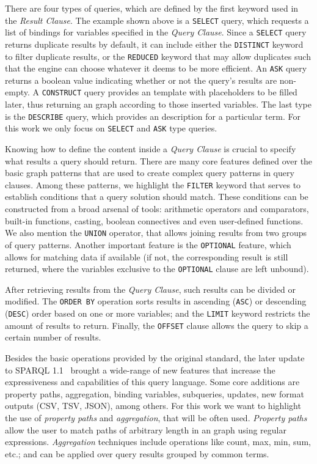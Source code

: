 There are four types of \SPARQL{} queries, which are defined by the first keyword used in the 
\textit{Result Clause}. The example shown above is a \texttt{SELECT} query, which requests a list 
of bindings for variables specified in the \textit{Query Clause}. Since a \texttt{SELECT} query 
returns duplicate results by default, it can include either the \texttt{DISTINCT} keyword to filter 
duplicate results, or the \texttt{REDUCED} keyword that may allow duplicates such that the engine 
can choose whatever it deems to be more efficient. An \texttt{ASK} query returns a boolean value 
indicating whether or not the query’s results are non-empty. A \texttt{CONSTRUCT} query provides 
an \RDF{} template with placeholders to be filled later, thus returning an \RDF{} graph according to 
those inserted variables. The last type is the \texttt{DESCRIBE} query, which provides an \RDF{} 
description for a particular \RDF{} term. For this work we only focus on \texttt{SELECT} and 
\texttt{ASK} type queries.

Knowing how to define the content inside a \textit{Query Clause} is crucial to specify what results 
a \SPARQL{} query should return. There are many core features defined over the basic graph patterns 
that are used to create complex query patterns in query clauses. Among these patterns, we highlight 
the \texttt{FILTER} keyword that serves to establish conditions that a query solution should match. 
These conditions can be constructed from a broad arsenal of tools: arithmetic operators and 
comparators, built-in functions, casting, boolean connectives and even user-defined functions. 
We also mention the \texttt{UNION} operator, that allows joining results from two groups of query 
patterns. Another important feature is the \texttt{OPTIONAL} feature, which allows for matching 
data if available (if not, the corresponding result is still returned, where the variables 
exclusive to the \texttt{OPTIONAL} clause are left unbound).

After retrieving results from the \textit{Query Clause}, such results can be divided or modified. 
The \texttt{ORDER BY} operation sorts results in ascending (\texttt{ASC}) or descending (\texttt{DESC}) order based 
on one or more variables; and the \texttt{LIMIT} keyword restricts the amount of results to return. 
Finally, the \texttt{OFFSET} clause allows the query to skip a certain number of results.

Besides the basic operations provided by the original \SPARQL{} standard, the later update to 
SPARQL 1.1~\cite{key:sparql11} brought a wide-range of new features that increase the expressiveness 
and capabilities of this query language. Some core additions are property paths, aggregation, 
binding variables, subqueries, updates, new format outputs (CSV, TSV, JSON), among others. 
For this work we want to highlight the use of \textit{property paths} and \textit{aggregation}, 
that will be often used. \textit{Property paths} allow the user to match paths of arbitrary 
length in an \RDF{} graph using regular expressions. \textit{Aggregation} techniques include 
operations like count, max, min, sum, etc.; and can be applied over query results grouped 
by common terms.

